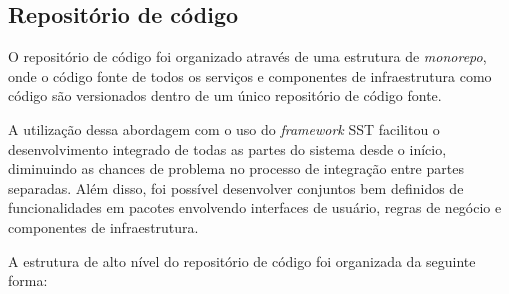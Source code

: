 \subsection{Repositório de código}
\label{subsec:repositorioDeCodigo}

O repositório de código foi organizado através de uma estrutura de \textit{monorepo}, onde o código fonte de todos os serviços e componentes de infraestrutura como código são versionados dentro de um único repositório de código fonte. 

A utilização dessa abordagem com o uso do \textit{framework} SST facilitou o desenvolvimento integrado de todas as partes do sistema desde o início, diminuindo as chances de problema no processo de integração entre partes separadas. Além disso, foi possível desenvolver conjuntos bem definidos de funcionalidades em pacotes envolvendo interfaces de usuário, regras de negócio e componentes de infraestrutura.

A estrutura de alto nível do repositório de código foi organizada da seguinte forma:

